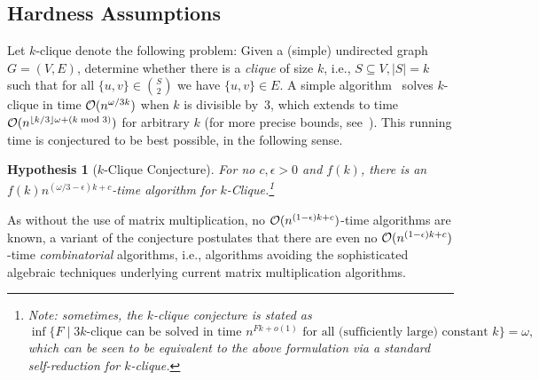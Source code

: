 \documentclass[10pt,a4paper]{article}
\theoremstyle{plain}
\newtheorem{hypo}[thm]{Hypothesis}
\newcommand{\Oh}{{\cal O}}
\newcommand{\eps}{\epsilon}
\begin{document}
\subsection{Hardness Assumptions}
%
Let $k$-clique denote the following problem: Given a (simple) undirected graph $G=(V,E)$, determine whether there is a \emph{clique} of size $k$, i.e., $S\subseteq V, |S|=k$ such that for all $\{u,v\} \in {S \choose 2}$ we have $\{u,v\} \in E$. A simple algorithm~\cite{NesetrilP85} solves $k$-clique in time $\Oh(n^{\omega/3 k})$ when $k$ is divisible by~$3$, which extends to time $\Oh(n^{\lfloor k/3\rfloor \omega + (k\bmod 3)})$ for arbitrary $k$ (for more precise bounds, see~\cite{EisenbrandG04}).
\label{sec:hardnessassumptions}
This running time is conjectured to be best possible, in the following sense.
%
\begin{hypo}[$k$-Clique Conjecture]
For no $c,\eps > 0$ and $f(k)$, there is an $f(k)n^{(\omega/3 - \epsilon)k+c}$-time algorithm for $k$-Clique.\footnote{Note: sometimes, the $k$-clique conjecture is stated as \[\inf \{ F \mid \text{$3k$-clique can be solved in time $n^{Fk+o(1)}$ for all (sufficiently large) constant $k$}\} = \omega,\] which can be seen to be equivalent to the above formulation via a standard self-reduction for $k$-clique.}
\end{hypo}
As without the use of matrix multiplication, no $\Oh(n^{(1-\eps)k+c})$-time algorithms are known, a variant of the conjecture postulates that there are even no $\Oh(n^{(1-\eps)k+c})$-time \emph{combinatorial} algorithms, i.e., algorithms avoiding the sophisticated algebraic techniques underlying current matrix multiplication algorithms. 
  
\end{document}
